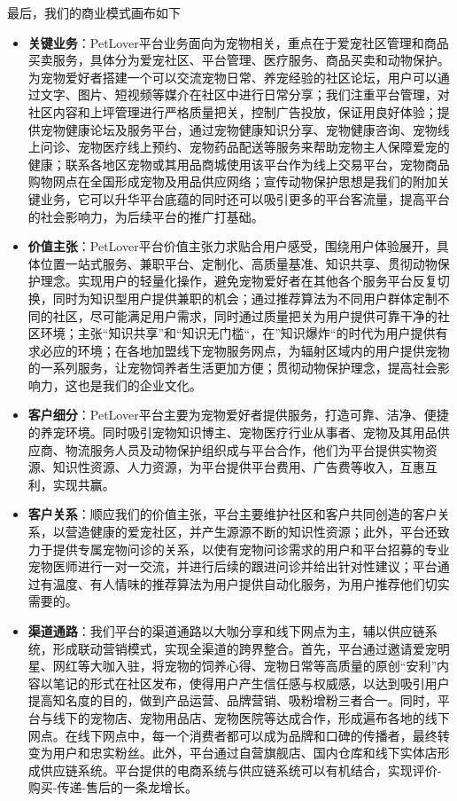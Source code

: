 \documentclass[a4paper]{ctexart}
\begin{document}
最后，我们的商业模式画布如下

\begin{itemize}
  \item \textbf{关键业务}：PetLover平台业务面向为宠物相关，重点在于爱宠社区管理和商品买卖服务，具体分为爱宠社区、平台管理、医疗服务、商品买卖和动物保护。为宠物爱好者搭建一个可以交流宠物日常、养宠经验的社区论坛，用户可以通过文字、图片、短视频等媒介在社区中进行日常分享；我们注重平台管理，对社区内容和上坪管理进行严格质量把关，控制广告投放，保证用良好体验；提供宠物健康论坛及服务平台，通过宠物健康知识分享、宠物健康咨询、宠物线上问诊、宠物医疗线上预约、宠物药品配送等服务来帮助宠物主人保障爱宠的健康；联系各地区宠物或其用品商城使用该平台作为线上交易平台，宠物商品购物网点在全国形成宠物及用品供应网络；宣传动物保护思想是我们的附加关键业务，它可以升华平台底蕴的同时还可以吸引更多的平台客流量，提高平台的社会影响力，为后续平台的推广打基础。
  \item \textbf{价值主张}：PetLover平台价值主张力求贴合用户感受，围绕用户体验展开，具体位置一站式服务、兼职平台、定制化、高质量基准、知识共享、贯彻动物保护理念。实现用户的轻量化操作，避免宠物爱好者在其他各个服务平台反复切换，同时为知识型用户提供兼职的机会；通过推荐算法为不同用户群体定制不同的社区，尽可能满足用户需求，同时通过质量把关为用户提供可靠干净的社区环境；主张“知识共享”和“知识无门槛“，在”知识爆炸“的时代为用户提供有求必应的环境；在各地加盟线下宠物服务网点，为辐射区域内的用户提供宠物的一系列服务，让宠物饲养者生活更加方便；贯彻动物保护理念，提高社会影响力，这也是我们的企业文化。
  \item \textbf{客户细分}：PetLover平台主要为宠物爱好者提供服务，打造可靠、洁净、便捷的养宠环境。同时吸引宠物知识博主、宠物医疗行业从事者、宠物及其用品供应商、物流服务人员及动物保护组织成与平台合作，他们为平台提供实物资源、知识性资源、人力资源，为平台提供平台费用、广告费等收入，互惠互利，实现共赢。
  \item \textbf{客户关系}：顺应我们的价值主张，平台主要维护社区和客户共同创造的客户关系，以营造健康的爱宠社区，并产生源源不断的知识性资源；此外，平台还致力于提供专属宠物问诊的关系，以使有宠物问诊需求的用户和平台招募的专业宠物医师进行一对一交流，并进行后续的跟进问诊并给出针对性建议；平台通过有温度、有人情味的推荐算法为用户提供自动化服务，为用户推荐他们切实需要的。
  \item \textbf{渠道通路}：我们平台的渠道通路以大咖分享和线下网点为主，辅以供应链系统，形成联动营销模式，实现全渠道的跨界整合。首先，平台通过邀请爱宠明星、网红等大咖入驻，将宠物的饲养心得、宠物日常等高质量的原创“安利”内容以笔记的形式在社区发布，使得用户产生信任感与权威感，以达到吸引用户提高知名度的目的，做到产品运营、品牌营销、吸粉增粉三者合一。同时，平台与线下的宠物店、宠物用品店、宠物医院等达成合作，形成遍布各地的线下网点。在线下网点中，每一个消费者都可以成为品牌和口碑的传播者，最终转变为用户和忠实粉丝。此外，平台通过自营旗舰店、国内仓库和线下实体店形成供应链系统。平台提供的电商系统与供应链系统可以有机结合，实现评价-购买-传递-售后的一条龙增长。

\end{itemize}
\end{document}
